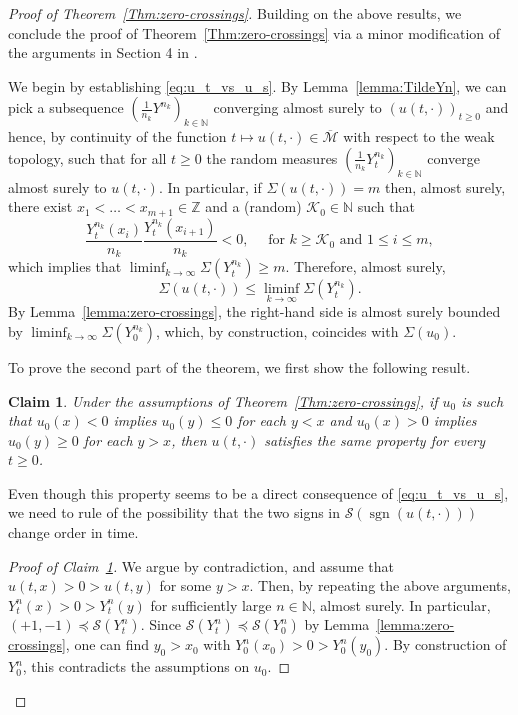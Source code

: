 \documentclass[12pt,reqno,oneside]{amsart}
\numberwithin{equation}{section}
\newtheorem{claim}[theorem]{Claim}
\theoremstyle{definition}
\theoremstyle{remark}
\newcommand{\N}{\mathbb{N}}
\newcommand{\Z}{\mathbb{Z}}
\DeclareMathOperator{\sgn}{sgn}
\begin{document}
\begin{proof}[Proof of Theorem~\ref{Thm:zero-crossings}]
  Building on the above results, we conclude the proof of
  Theorem~\ref{Thm:zero-crossings} via a minor modification of the arguments
  in Section 4 in \cite{EW99}.

  We begin by establishing \eqref{eq:u_t_vs_u_s}. By
  Lemma~\ref{lemma:TildeYn}, we can pick a subsequence
  $(\frac{1}{n_k}Y^{n_k})_{k \in \N}$ converging almost surely to
  $(u(t,\cdot))_{t \geq 0}$ and hence, by continuity of the
    function $t \mapsto u(t,\cdot) \in \overline{\mathcal{M}}$ with respect
    to the weak topology, such that for all $t \geq 0$ the random measures
  $(\frac{1}{n_k}Y_t^{n_k})_{k \in \N}$ converge almost surely to
  $u(t,\cdot)$. In particular, if $\Sigma(u(t,\cdot))= m$ then, almost
  surely, there exist $x_1<\dots<x_{m+1} \in \Z$ and a (random)
  $\mathcal{K}_0 \in \N$ such that
  \begin{equation*}
    \frac{Y_t^{n_k}(x_i)}{n_k}\frac{Y_t^{n_k}(x_{i+1})}{n_k}
    <0, \quad \text{ for } k \geq \mathcal{K}_0 \text{ and } 1 \leq i \leq m,
  \end{equation*}
  which implies that $\liminf_{k \rightarrow \infty} \Sigma(Y_t^{n_k}) \geq m$.
  Therefore, almost surely,
    \begin{equation*}
      \Sigma(u(t,\cdot)) \leq \liminf_{k \rightarrow \infty} \Sigma(Y_t^{n_k}).
    \end{equation*}
    By Lemma~\ref{lemma:zero-crossings}, the right-hand side is almost surely
    bounded by $\liminf_{k \rightarrow \infty}\Sigma(Y^{n_k}_0)$, which, by
    construction, coincides with $\Sigma (u_0)$.

  To prove the second part of the theorem, we first show the following result.

  \begin{claim}
    \label{claim}
    Under the assumptions of Theorem~\ref{Thm:zero-crossings}, if $u_0$ is
    such that $u_0(x)<0$ implies $u_0(y)\leq 0$ for each $y <x$  and
    $u_0(x)>0$ implies $u_0(y)\geq0$  for each  $y >x$, then $u(t,\cdot)$
    satisfies the same property for every $t \geq 0$.
  \end{claim}

  Even though this property seems to be a direct consequence of
  \eqref{eq:u_t_vs_u_s}, we need to rule of the possibility that the two
  signs in $\mathcal{S}(\sgn(u(t,\cdot)))$ change order in time.

  \begin{proof}[Proof of Claim~\ref{claim}]
    We argue by contradiction, and assume that $u(t,x)>0>u(t,y)$ for some
    $y>x$. Then, by repeating the above arguments, $Y_t^{n}(x)>0>Y_t^{n}(y)$
    for sufficiently large $n \in \N$, almost surely. In particular,
    $(+1,-1) \preceq \mathcal{S}(Y_t^n)$. Since
    $\mathcal{S}(Y_t^n) \preceq \mathcal{S}(Y_0^n)$ by
    Lemma~\ref{lemma:zero-crossings}, one can find $y_0>x_0$ with
    $Y_0^{n}(x_0)>0>Y_0^{n}(y_0)$. By construction of $Y_0^n$, this
    contradicts the assumptions on $u_0$.
  \end{proof}


\end{proof}
\end{document}

